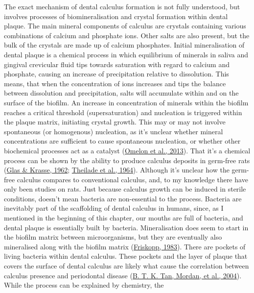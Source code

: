 \documentclass[
  letterpaper,
]{book}
\begin{document}
The exact mechanism of dental calculus formation is not fully
understood, but involves processes of biomineralisation and crystal
formation within dental plaque. The main mineral components of calculus
are crystals containing various combinations of calcium and phosphate
ions. Other salts are also present, but the bulk of the crystals are
made up of calcium phosphates. Initial mineralisation of dental plaque
is a chemical process in which equilibrium of minerals in saliva and
gingival crevicular fluid tips towards saturation with regard to calcium
and phosphate, causing an increase of precipitation relative to
dissolution. This means, that when the concentration of ions increases
and tips the balance between dissolution and precipitation, salts will
accumulate within and on the surface of the biofilm. An increase in
concentration of minerals within the biofilm reaches a critical
threshold (supersaturation) and nucleation is triggered within the
plaque matrix, initiating crystal growth. This may or may not involve
spontaneous (or homogenous) nucleation, as it's unclear whether mineral
concentrations are sufficient to cause spontaneous nucleation, or
whether other biochemical processes act as a catalyst
(\protect\hyperlink{ref-omelonReviewPhosphate2013}{Omelon et al.,
2013}). That it's a chemical process can be shown by the ability to
produce calculus deposits in germ-free rats
(\protect\hyperlink{ref-glasBiophysicalStudies1962}{Glas \& Krasse,
1962}; \protect\hyperlink{ref-theiladeGermfreeCalculus1964}{Theilade et
al., 1964}). Although it's unclear how the germ-free calculus compares
to conventional calculus, and, to my knowledge there have only been
studies on rats. Just because calculus growth can be induced in sterile
conditions, doesn't mean bacteria are non-essential to the process.
Bacteria are inevitably part of the scaffolding of dental calculus in
humans, since, as I mentioned in the beginning of this chapter, our
mouths are full of bacteria, and dental plaque is essentially built by
bacteria. Mineralisation does seem to start in the biofilm matrix
between microorganisms, but they are eventually also mineralised along
with the biofilm matrix
(\protect\hyperlink{ref-friskoppUltrastructureNondecalcified1983}{Friskopp,
1983}). There are pockets of living bacteria within dental calculus.
These pockets and the layer of plaque that covers the surface of dental
calculus are likely what cause the correlation between calculus presence
and periodontal disease
(\protect\hyperlink{ref-tanBacterialViability2004}{B. T. K. Tan, Mordan,
et al., 2004}). While the process can be explained by chemistry, the
\end{document}
